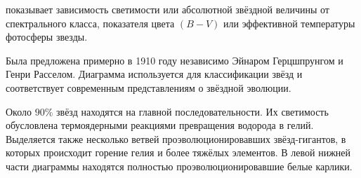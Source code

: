 
 показывает зависимость светимости или абсолютной звёздной величины от спектрального класса, показателя цвета $(B-V)$ или эффективной температуры фотосферы звезды.

Была предложена примерно в 1910 году независимо Эйнаром Герцшпрунгом и Генри Расселом. Диаграмма используется для классификации звёзд и соответствует современным представлениям о звёздной эволюции.

Около $90 \%$ звёзд находятся на главной последовательности. Их светимость обусловлена термоядерными реакциями превращения водорода в гелий. Выделяется также несколько ветвей проэволюционировавших звёзд-гигантов, в которых происходит горение гелия и более тяжёлых элементов. В левой нижней части диаграммы находятся полностью проэволюционировавшие белые карлики.

